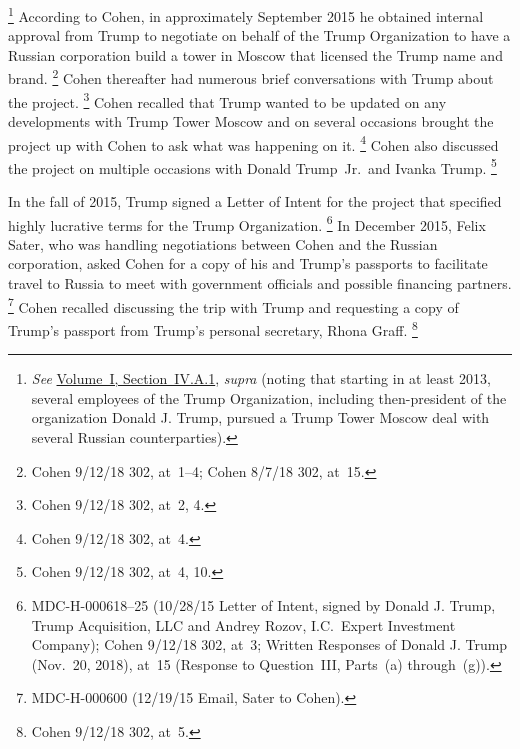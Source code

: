 \footnote{\textit{See} \hyperlink{subsubsection.1.4.1.1}{Volume~I, Section~IV.A.1}, \textit{supra} (noting that starting in at least 2013, several employees of the Trump Organization, including then-president of the organization Donald J. Trump, pursued a Trump Tower Moscow deal with several Russian counterparties).}
According to Cohen, in approximately September 2015 he obtained internal approval from Trump to negotiate on behalf of the Trump Organization to have a Russian corporation build a tower in Moscow that licensed the Trump name and brand.%
\footnote{Cohen 9/12/18 302, at~1--4;
Cohen 8/7/18 302, at~15.}
Cohen thereafter had numerous brief conversations with Trump about the project.%
\footnote{Cohen 9/12/18 302, at~2, 4.}
Cohen recalled that Trump wanted to be updated on any developments with Trump Tower Moscow and on several occasions brought the project up with Cohen to ask what was happening on it.%
\footnote{Cohen 9/12/18 302, at~4.}
Cohen also discussed the project on multiple occasions with Donald Trump~Jr.\ and Ivanka Trump.%
\footnote{Cohen 9/12/18 302, at~4, 10.}

In the fall of 2015, Trump signed a Letter of Intent for the project that specified highly lucrative terms for the Trump Organization.%
\footnote{MDC-H-000618--25 (10/28/15 Letter of Intent, signed by Donald J. Trump, Trump Acquisition, LLC and Andrey Rozov, I.C.~Expert Investment Company);
Cohen 9/12/18 302, at~3;
Written Responses of Donald J. Trump (Nov.~20, 2018), at~15 (Response to Question~III, Parts~(a) through~(g)).}
In December 2015, Felix Sater, who was handling negotiations between Cohen and the Russian corporation, asked Cohen for a copy of his and Trump's passports to facilitate travel to Russia to meet with government officials and possible financing partners.%
\footnote{MDC-H-000600 (12/19/15 Email, Sater to Cohen).}
Cohen recalled discussing the trip with Trump and requesting a copy of Trump's passport from Trump's personal secretary, Rhona Graff.%
\footnote{Cohen 9/12/18 302, at~5.}

